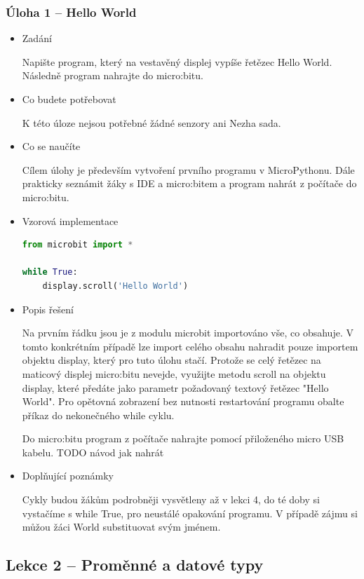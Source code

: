 \documentclass[
  digital,     %
  oneside,     %
  nosansbold,  %
  colorbold, %
  lof,         %
  nolot,         %
]{fithesis4}
\begin{document}
\subsubsection{Úloha 1 -- Hello World}
\begin{itemize}
    \item Zadání

Napište program, který na vestavěný displej vypíše řetězec Hello World. Následně program nahrajte do micro:bitu.
    \item Co budete potřebovat

K této úloze nejsou potřebné žádné senzory ani Nezha sada.
    \item Co se naučíte

Cílem úlohy je především vytvoření prvního programu v MicroPythonu. Dále prakticky seznámit žáky s IDE a micro:bitem a program nahrát z počítače do micro:bitu.
    \item Vzorová implementace
\begin{lstlisting}[language=Python, caption=Úloha 1 - Hello World]
from microbit import *

while True:
    display.scroll('Hello World')
\end{lstlisting}
    \item Popis řešení

Na prvním řádku jsou je z modulu microbit importováno vše, co obsahuje. V tomto konkrétním případě lze import celého obsahu nahradit pouze importem objektu display, který pro tuto úlohu stačí. Protože se celý řetězec na maticový displej micro:bitu nevejde, využijte metodu scroll na objektu display, které předáte jako parametr požadovaný textový řetězec "Hello World". Pro opětovná zobrazení bez nutnosti restartování programu obalte příkaz do nekonečného while cyklu.

Do micro:bitu program z počítače nahrajte pomocí přiloženého micro USB kabelu. TODO návod jak nahrát
    \item Doplňující poznámky

Cykly budou žákům podrobněji vysvětleny až v lekci 4, do té doby si vystačíme s while True, pro neustálé opakování programu. V případě zájmu si můžou žáci World substituovat svým jménem.
\end{itemize}

\subsection{Lekce 2 -- Proměnné a datové typy}
\end{document}
